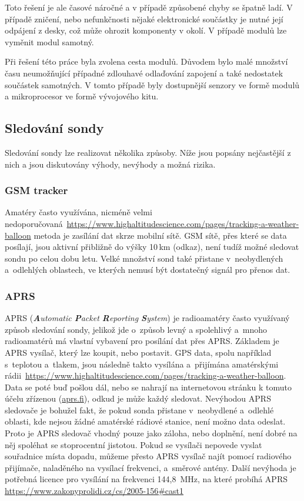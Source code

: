 \documentclass[twoside]{ctuthesis}
\theoremstyle{plain}
\theoremstyle{definition}
\theoremstyle{note}
\begin{document}
	Toto řešení je ale časové náročné a v případě způsobené chyby se špatně ladí. V případě zničení, nebo nefunkčnosti nějaké elektronické součástky je nutné její odpájení z desky, což může ohrozit komponenty v okolí. V případě modulů lze vyměnit modul samotný.

	Při řešení této práce byla zvolena cesta modulů. Důvodem bylo malé množství času neumožňující případné zdlouhavé odlaďování zapojení a také nedostatek součástek samotných. V tomto případě byly dostupnější senzory ve formě modulů a mikroprocesor ve formě vývojového kitu. 

	
		\subsection{Sledování sondy}
		Sledování sondy lze realizovat několika způsoby. Níže jsou popsány nejčastější z nich a jsou diskutovány výhody, nevýhody a možná rizika.

			\subsubsection{GSM tracker}
			Amatéry často využívána, nicméně velmi nedoporučovaná~\url{https://www.highaltitudescience.com/pages/tracking-a-weather-balloon} metoda je zasílání dat skrze mobilní sítě. GSM sítě, přes které se data posílají, jsou aktivní přibližně do výšky 10\,km (odkaz), není tudíž možné sledovat sondu po celou dobu letu. Velké množství sond také přistane v~neobydlených a~odlehlých oblastech, ve kterých nemusí být dostatečný signál pro přenos dat.


			\subsubsection{APRS}
			APRS (\textit{\textbf{A}utomatic \textbf{P}acket \textbf{R}eporting \textbf{S}ystem}) je radioamatéry často využívaný způsob sledování sondy, jelikož jde o~způsob levný a spolehlivý a~mnoho radioamatérů má vlastní vybavení pro posílání dat přes APRS. Základem je APRS vysílač, který lze koupit, nebo postavit. GPS data, spolu například s~teplotou a~tlakem, jsou následně takto vysílána a~přijímána amatérskými rádii~\url{https://www.highaltitudescience.com/pages/tracking-a-weather-balloon}. Data se poté buď pošlou dál, nebo se nahrají na internetovou stránku k tomuto účelu zřízenou (\url{aprs.fi}), odkud je může každý sledovat.
			Nevýhodou APRS sledovače je bohužel fakt, že pokud sonda přistane v~neobydlené a~odlehlé oblasti, kde nejsou žádné amatérské rádiové stanice, není možno data odeslat. Proto je APRS sledovač vhodný pouze jako záloha, nebo doplnění, není dobré na něj spoléhat se stoprocentní jistotou. Pokud se vysílači nepovede vyslat souřadnice místa dopadu, můžeme přesto APRS vysílač najít pomocí radiového přijímače, naladěného na vysílací frekvenci, a~směrové antény. Další nevýhoda je potřebná licence pro vysílání na frekvenci 144,8~MHz, na které probíhá APRS \url{https://www.zakonyprolidi.cz/cs/2005-156#cast1}
\end{document}
